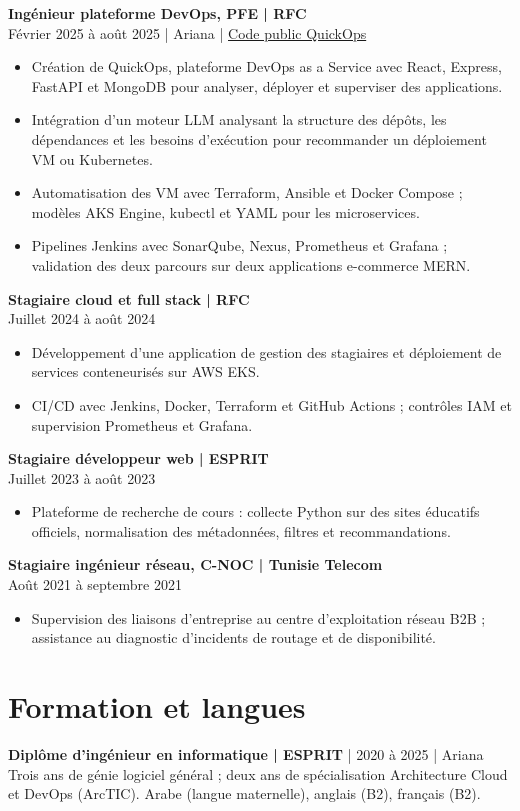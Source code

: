 \documentclass[11pt,a4paper]{article}
\newcommand{\role}[3]{\Needspace{5\baselineskip}\textbf{#1 | #2}\\#3\par}
\begin{document}
\role{Ingénieur plateforme DevOps, PFE}{RFC}{Février 2025 à août 2025 | Ariana | \href{https://github.com/tamim-hmizi/QuickOps-AI}{Code public QuickOps}}
\begin{itemize}
\item Création de QuickOps, plateforme DevOps as a Service avec React, Express, FastAPI et MongoDB pour analyser, déployer et superviser des applications.
\item Intégration d'un moteur LLM analysant la structure des dépôts, les dépendances et les besoins d'exécution pour recommander un déploiement VM ou Kubernetes.
\item Automatisation des VM avec Terraform, Ansible et Docker Compose ; modèles AKS Engine, kubectl et YAML pour les microservices.
\item Pipelines Jenkins avec SonarQube, Nexus, Prometheus et Grafana ; validation des deux parcours sur deux applications e-commerce MERN.
\end{itemize}

\role{Stagiaire cloud et full stack}{RFC}{Juillet 2024 à août 2024}
\begin{itemize}
\item Développement d'une application de gestion des stagiaires et déploiement de services conteneurisés sur AWS EKS.
\item CI/CD avec Jenkins, Docker, Terraform et GitHub Actions ; contrôles IAM et supervision Prometheus et Grafana.
\end{itemize}

\role{Stagiaire développeur web}{ESPRIT}{Juillet 2023 à août 2023}
\begin{itemize}
\item Plateforme de recherche de cours : collecte Python sur des sites éducatifs officiels, normalisation des métadonnées, filtres et recommandations.
\end{itemize}

\role{Stagiaire ingénieur réseau, C-NOC}{Tunisie Telecom}{Août 2021 à septembre 2021}
\begin{itemize}
\item Supervision des liaisons d'entreprise au centre d'exploitation réseau B2B ; assistance au diagnostic d'incidents de routage et de disponibilité.
\end{itemize}

\section{Formation et langues}
\textbf{Diplôme d'ingénieur en informatique | ESPRIT} | 2020 à 2025 | Ariana\\
Trois ans de génie logiciel général ; deux ans de spécialisation Architecture Cloud et DevOps (ArcTIC). Arabe (langue maternelle), anglais (B2), français (B2).
\end{document}
